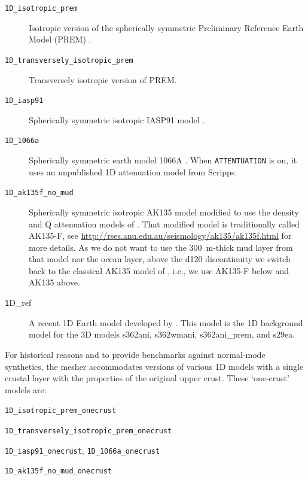 \documentclass[oneside,english]{book}
\begin{document}
\begin{description}
\begin{description}
\item [{\texttt{1D\_isotropic\_prem}}] Isotropic version of the spherically
symmetric Preliminary Reference Earth Model (PREM) \citep{DzAn81}.
\item [{\texttt{1D\_transversely\_isotropic\_prem}}] Transversely isotropic
version of PREM.
\item [{\texttt{1D\_iasp91}}] Spherically symmetric isotropic IASP91 model
\citep{KeEn91}.
\item [{\texttt{1D\_1066a}}] Spherically symmetric earth model 1066A \citep{gilbertdziewonski1975}.
When \texttt{\small ATTENTUATION} is on, it uses an unpublished 1D
attenuation model from Scripps.
\item [{\texttt{1D\_ak135f\_no\_mud}}] Spherically symmetric isotropic AK135 model
\citep{KeEnBu95} modified to use the density and Q attenuation models of \cite{MoKe95}.
That modified model is traditionally called AK135-F,
see \url{http://rses.anu.edu.au/seismology/ak135/ak135f.html} for more details.
As we do not want to use the 300~m-thick mud layer from that model nor the ocean layer,
above the d120 discontinuity we switch back to the classical AK135 model of \cite{KeEnBu95},
i.e., we use AK135-F below and AK135 above.
\item [{\texttt{1}D\_ref}] A recent 1D Earth model developed by \citet{KuDzEk06}.
This model is the 1D background model for the 3D models s362ani, s362wmani,
s362ani\_prem, and s29ea.
\end{description}
\end{description}
For historical reasons and to provide benchmarks against normal-mode
synthetics, the mesher accommodates versions of various 1D models
with a single crustal layer with the properties of the original upper
crust. These `one-crust' models are:

\texttt{1D\_isotropic\_prem\_onecrust}

\texttt{1D\_transversely\_isotropic\_prem\_onecrust}

\texttt{1D\_iasp91\_onecrust}, \texttt{1D\_1066a\_onecrust}

\texttt{1D\_ak135f\_no\_mud\_onecrust}
\end{document}

